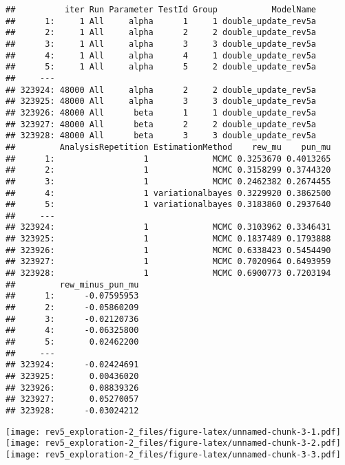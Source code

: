 \documentclass[]{article}
\begin{document}
\begin{verbatim}
##          iter Run Parameter TestId Group           ModelName
##      1:     1 All     alpha      1     1 double_update_rev5a
##      2:     1 All     alpha      2     2 double_update_rev5a
##      3:     1 All     alpha      3     3 double_update_rev5a
##      4:     1 All     alpha      4     1 double_update_rev5a
##      5:     1 All     alpha      5     2 double_update_rev5a
##     ---                                                     
## 323924: 48000 All     alpha      2     2 double_update_rev5a
## 323925: 48000 All     alpha      3     3 double_update_rev5a
## 323926: 48000 All      beta      1     1 double_update_rev5a
## 323927: 48000 All      beta      2     2 double_update_rev5a
## 323928: 48000 All      beta      3     3 double_update_rev5a
##         AnalysisRepetition EstimationMethod    rew_mu    pun_mu
##      1:                  1             MCMC 0.3253670 0.4013265
##      2:                  1             MCMC 0.3158299 0.3744320
##      3:                  1             MCMC 0.2462382 0.2674455
##      4:                  1 variationalbayes 0.3229920 0.3862500
##      5:                  1 variationalbayes 0.3183860 0.2937640
##     ---                                                        
## 323924:                  1             MCMC 0.3103962 0.3346431
## 323925:                  1             MCMC 0.1837489 0.1793888
## 323926:                  1             MCMC 0.6338423 0.5454490
## 323927:                  1             MCMC 0.7020964 0.6493959
## 323928:                  1             MCMC 0.6900773 0.7203194
##         rew_minus_pun_mu
##      1:      -0.07595953
##      2:      -0.05860209
##      3:      -0.02120736
##      4:      -0.06325800
##      5:       0.02462200
##     ---                 
## 323924:      -0.02424691
## 323925:       0.00436020
## 323926:       0.08839326
## 323927:       0.05270057
## 323928:      -0.03024212
\end{verbatim}

\texttt{[image: rev5\_exploration-2\_files/figure-latex/unnamed-chunk-3-1.pdf]}
\texttt{[image: rev5\_exploration-2\_files/figure-latex/unnamed-chunk-3-2.pdf]}
\texttt{[image: rev5\_exploration-2\_files/figure-latex/unnamed-chunk-3-3.pdf]}
\end{document}
